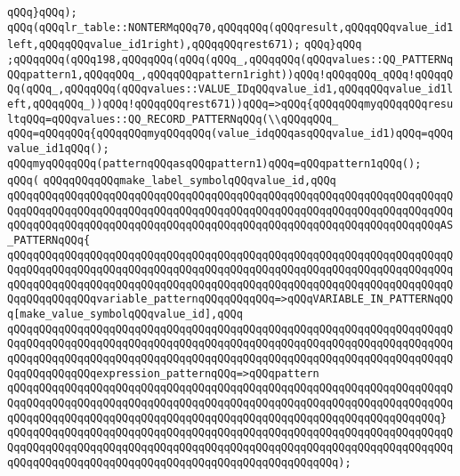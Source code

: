 \verb|qQQq}qQQq);|\newline
\verb|qQQq(qQQqlr_table::NONTERMqQQq70,qQQqqQQq(qQQqresult,qQQqqQQqvalue_id1left,qQQqqQQqvalue_id1right),qQQqqQQqrest671);|\newline
\verb|qQQq}qQQq|\newline
\verb|;qQQqqQQq(qQQq198,qQQqqQQq(qQQq(qQQq_,qQQqqQQq(qQQqvalues::QQ_PATTERNqQQqpattern1,qQQqqQQq_,qQQqqQQqpattern1right))qQQq!qQQqqQQq_qQQq!qQQqqQQq(qQQq_,qQQqqQQq(qQQqvalues::VALUE_IDqQQqvalue_id1,qQQqqQQqvalue_id1left,qQQqqQQq_))qQQq!qQQqqQQqrest671))qQQq=>qQQq{qQQqqQQqmyqQQqqQQqresultqQQq=qQQqvalues::QQ_RECORD_PATTERNqQQq(\\qQQqqQQq_|\newline
\verb|qQQq=qQQqqQQq{qQQqqQQqmyqQQqqQQq(value_idqQQqasqQQqvalue_id1)qQQq=qQQqvalue_id1qQQq();|\newline
\verb|qQQqmyqQQqqQQq(patternqQQqasqQQqpattern1)qQQq=qQQqpattern1qQQq();|\newline
\verb|qQQq(|\newline
\verb|qQQqqQQqqQQqmake_label_symbolqQQqvalue_id,qQQq|\newline
\verb|qQQqqQQqqQQqqQQqqQQqqQQqqQQqqQQqqQQqqQQqqQQqqQQqqQQqqQQqqQQqqQQqqQQqqQQqqQQqqQQqqQQqqQQqqQQqqQQqqQQqqQQqqQQqqQQqqQQqqQQqqQQqqQQqqQQqqQQqqQQqqQQqqQQqqQQqqQQqqQQqqQQqqQQqqQQqqQQqqQQqqQQqqQQqqQQqqQQqqQQqqQQqqQQqAS_PATTERNqQQq{|\newline
\verb|qQQqqQQqqQQqqQQqqQQqqQQqqQQqqQQqqQQqqQQqqQQqqQQqqQQqqQQqqQQqqQQqqQQqqQQqqQQqqQQqqQQqqQQqqQQqqQQqqQQqqQQqqQQqqQQqqQQqqQQqqQQqqQQqqQQqqQQqqQQqqQQqqQQqqQQqqQQqqQQqqQQqqQQqqQQqqQQqqQQqqQQqqQQqqQQqqQQqqQQqqQQqqQQqqQQqqQQqqQQqqQQqvariable_patternqQQqqQQqqQQq=>qQQqVARIABLE_IN_PATTERNqQQq[make_value_symbolqQQqvalue_id],qQQq|\newline
\verb|qQQqqQQqqQQqqQQqqQQqqQQqqQQqqQQqqQQqqQQqqQQqqQQqqQQqqQQqqQQqqQQqqQQqqQQqqQQqqQQqqQQqqQQqqQQqqQQqqQQqqQQqqQQqqQQqqQQqqQQqqQQqqQQqqQQqqQQqqQQqqQQqqQQqqQQqqQQqqQQqqQQqqQQqqQQqqQQqqQQqqQQqqQQqqQQqqQQqqQQqqQQqqQQqqQQqqQQqqQQqqQQqexpression_patternqQQq=>qQQqpattern|\newline
\verb|qQQqqQQqqQQqqQQqqQQqqQQqqQQqqQQqqQQqqQQqqQQqqQQqqQQqqQQqqQQqqQQqqQQqqQQqqQQqqQQqqQQqqQQqqQQqqQQqqQQqqQQqqQQqqQQqqQQqqQQqqQQqqQQqqQQqqQQqqQQqqQQqqQQqqQQqqQQqqQQqqQQqqQQqqQQqqQQqqQQqqQQqqQQqqQQqqQQqqQQqqQQqqQQq}|\newline
\verb|qQQqqQQqqQQqqQQqqQQqqQQqqQQqqQQqqQQqqQQqqQQqqQQqqQQqqQQqqQQqqQQqqQQqqQQqqQQqqQQqqQQqqQQqqQQqqQQqqQQqqQQqqQQqqQQqqQQqqQQqqQQqqQQqqQQqqQQqqQQqqQQqqQQqqQQqqQQqqQQqqQQqqQQqqQQqqQQqqQQqqQQqqQQqqQQq);|\newline

